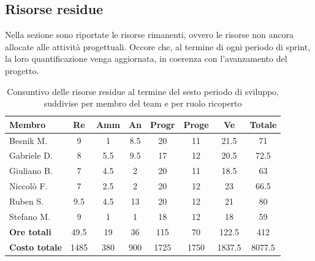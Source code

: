 \documentclass[a4paper,10pt]{article}
\begin{document}
\subsection{Risorse residue}
Nella sezione sono riportate le risorse rimanenti, ovvero le risorse non ancora allocate alle attività progettuali. Occore che, al termine di ogni periodo di sprint, la loro quantificazione venga aggiornata, in coerenza con l'avanzamento del progetto.

\begin{table}[H]
  \centering
  \begin{tabular}{|l|c|c|c|c|c|c|c|}
    \hline
    \textbf{Membro} & \textbf{Re} & \textbf{Amm} & \textbf{An} & \textbf{Progr} & \textbf{Proge} & \textbf{Ve} & \textbf{Totale} \\
    \hline
    Besnik M.   & 9  & 1   & 8.5 & 20  & 11  & 21.5 & 71   \\
    Gabriele D. & 8   & 5.5 & 9.5  & 17  & 12  & 20.5 & 72.5 \\
    Giuliano B. & 7   & 4.5 & 2 & 20 & 11  & 18.5 & 63 \\
    Niccolò F.  & 7   & 2.5 & 2   & 20  & 12  & 23   & 66.5   \\
    Ruben S.    & 9.5 & 4.5 & 13  & 20  & 12  & 21   & 80  \\
    Stefano M.  & 9   & 1   & 1   & 18  & 12  & 18   & 59   \\
    \hline
    \textbf{Ore totali}   & 49.5 & 19   & 36   & 115  & 70  & 122.5 & 412 \\
    \hline
    \textbf{Costo totale} & 1485  & 380 & 900 & 1725  & 1750  & 1837.5 & 8077.5 \\
    \hline
  \end{tabular}
  \caption{Consuntivo delle risorse residue al termine del sesto periodo di sviluppo, suddivise per membro del team e per ruolo ricoperto}
\end{table}
\end{document}
